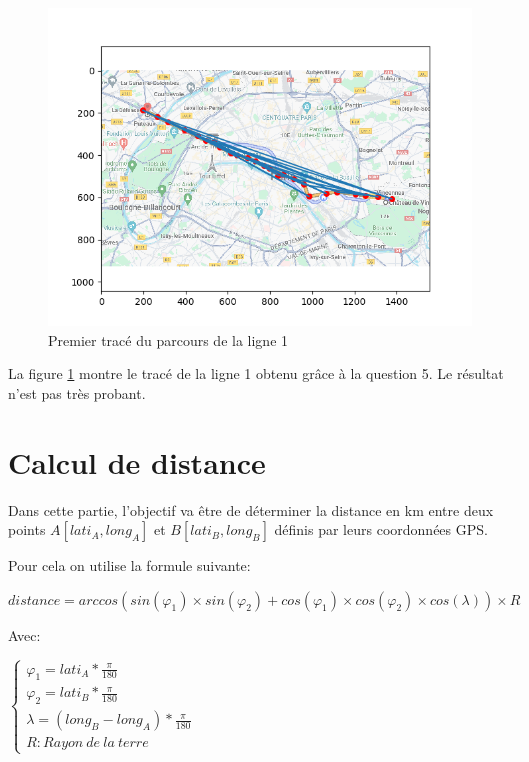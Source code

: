 
\begin{figure}[ht!]
\begin{center}
\includegraphics[width=0.5\linewidth]{img/fig02}
\end{center}
\caption{\label{fig01} Premier tracé du parcours de la ligne 1}
\end{figure}

La figure \ref{fig01} montre le tracé de la ligne 1 obtenu grâce à la question 5. Le résultat n'est pas très probant.

\section{Calcul de distance}

Dans cette partie, l'objectif va être de déterminer la distance en km entre deux points $A[lati_A,long_A]$ et $B[lati_B,long_B]$ définis par leurs coordonnées GPS.

Pour cela on utilise la formule suivante:
\begin{center}
$distance=arccos(sin(\varphi_1)\times sin(\varphi_2)+cos(\varphi_1)\times cos(\varphi_2)
\times cos(\lambda))\times R$
\end{center}

Avec:
\begin{center}
$\left\{\begin{array}{l}
\varphi_1=lati_A*\frac{\pi}{180}\\
\varphi_2=lati_B*\frac{\pi}{180}\\
\lambda=(long_B-long_A)*\frac{\pi}{180}\\
R: Rayon\ de\ la\ terre
\end{array}\right.$
\end{center}


